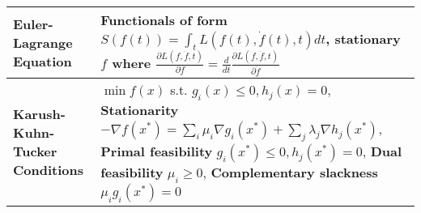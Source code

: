 \documentclass[11pt]{article}
\begin{document}
\begin{longtable}{|>{\raggedright}m{4.5cm}|m{13cm}|}
\textbf{Euler-Lagrange Equation} & Functionals of form $S(f(t)) = \int_t L\left( f(t), \dot{f}(t), t \right) dt$, stationary $f$ where $\frac{\partial L(f, \dot{f}, t)}{\partial f} = \frac{d}{dt} \frac{\partial L(f, \dot{f}, t)}{\partial \dot{f}}$\\ \hline
\textbf{Karush-Kuhn-Tucker Conditions} & $\min f(x)$ s.t. $g_i(x)\leq 0, h_j(x)=0$, {\bf Stationarity} $-\nabla f(x^*) = \sum_i \mu_i \nabla g_i(x^*) + \sum_j \lambda_j \nabla h_j (x^*)$, {\bf Primal feasibility} $g_i(x^*) \leq 0, h_j(x^*)=0$, {\bf Dual feasibility} $\mu_i \geq 0$, {\bf Complementary slackness} $\mu_i g_i(x^*)=0$\\ \hline
\end{longtable}
\end{document}

